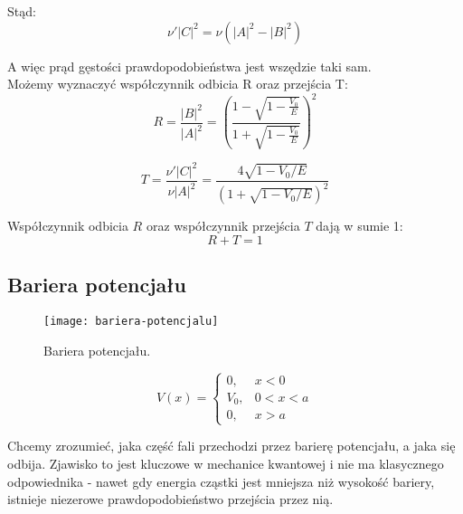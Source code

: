 Stąd:
\begin{equation*}
    \nu' \left| C \right| ^2 = \nu \left( \left| A \right| ^2 - \left| B \right| ^2 \right)
\end{equation*}

A więc prąd gęstości prawdopodobieństwa jest wszędzie taki sam. \\

Możemy wyznaczyć współczynnik odbicia R oraz przejścia T:
\begin{equation*}
    R = \frac{\left| B \right|^2}{\left| A \right|^2} = \left( \frac{1 - \sqrt{1 - \frac{V_0}{E}}}{1 + \sqrt{1 - \frac{V_0}{E}}} \right)^2
\end{equation*}

\begin{equation*}
    T = \frac{\nu' \left| C \right| ^2}{\nu \left| A \right| ^2} = \frac{4 \sqrt{1 - V_0/E}}{\left( 1 + \sqrt{1 - V_0/E} \right)^2}
\end{equation*}

Współczynnik odbicia $R$ oraz współczynnik przejścia $T$ dają w sumie 1:
\begin{equation*}
    R + T = 1
\end{equation*}



\subsection{Bariera potencjału}

\begin{figure}[H]
    \centering
    \texttt{[image: bariera-potencjalu]}
    \caption{Bariera potencjału.}
    \label{fig:bariera-potencjalu}
\end{figure}

\begin{equation*}
    V(x) = 
    \begin{cases}
        0, & x < 0 \\
        V_0, & 0 < x < a \\
        0, & x > a
    \end{cases}
\end{equation*}

Chcemy zrozumieć, jaka część fali przechodzi przez barierę potencjału, a jaka się odbija.
Zjawisko to jest kluczowe w mechanice kwantowej i nie ma klasycznego odpowiednika - nawet gdy energia cząstki
jest mniejsza niż wysokość bariery, istnieje niezerowe prawdopodobieństwo przejścia przez nią.

